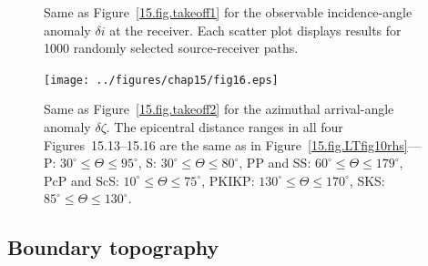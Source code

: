 {\begin{figure}
\begin{center}
\end{center}
\caption[arrival angle 1]
{\label{15.fig.arrival1}
Same as Figure~\ref{15.fig.takeoff1} for the observable incidence-angle
anomaly $\delta i$ at the receiver.
Each scatter plot displays results for 1000 randomly selected source-receiver paths.}
\end{figure}
\begin{figure}
\begin{center}
\texttt{[image: ../figures/chap15/fig16.eps]}
\end{center}
\caption[arrival 2]
{\label{15.fig.arrival2}
Same as Figure~\ref{15.fig.takeoff2} for the azimuthal
arrival-angle anomaly $\delta\zeta$.
The epicentral distance ranges in all four Figures~15.13--15.16
are the same as
in Figure~\ref{15.fig.LTfig10rhs}---P: $30^{\circ}\leq\Theta\leq 95^{\circ}$,
S: $30^{\circ}\leq\Theta\leq 80^{\circ}$, PP and SS:
$60^{\circ}\leq\Theta\leq 179^{\circ}$, PcP and ScS:
$10^{\circ}\leq\Theta\leq 75^{\circ}$, PKIKP:
$130^{\circ}\leq\Theta\leq 170^{\circ}$, SKS:
$85^{\circ}\leq\Theta\leq 130^{\circ}$.}
\end{figure}
%

\renewcommand{\thesubsection}{$\!\!\!\raise1.3ex\hbox{$\star$}\!\!$
\arabic{chapter}.\arabic{section}.\arabic{subsection}}
\subsection{Boundary topography}
\renewcommand{\thesubsection}{\arabic{chapter}.\arabic{section}.\arabic{subsection}}

}
